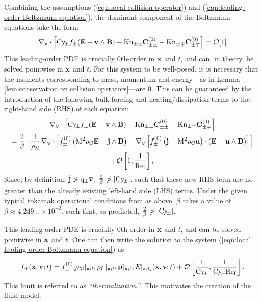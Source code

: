     Combining the assumptions (\ref{eqn:local collision operator}) and (\ref{eqn:leading-order Boltzmann equation}), the dominant component of the Boltzmann equations take the form
    \begin{equation}
        \nabla_{\mathbf{v}}\cdot\left[\mathrm{Cy}\!_{\pm}f_{\pm}(\mathbf{E} + \mathbf{v}\wedge\mathbf{B}) - \mathrm{Kn}_{\pm\pm}\mathbf{C}_{\pm\pm}^{(0)} - \mathrm{Kn}_{\pm\mp}\mathbf{C}_{\pm\mp}^{(0)}\right]  =  \mathcal{O}[1]
    \end{equation}
    This leading-order PDE is crucially 0th-order in $\mathbf{x}$ and $t$, and can, in theory, be solved pointwise in $\mathbf{x}$ and $t$. For this system to be well-posed, it is necessary that the moments corresponding to mass, momentum and energy---as in Lemma \ref{lem:conservation on collision operators}---are 0. This can be guaranteed by the introduction of the following bulk forcing and heating/dissipation terms to the right-hand side (RHS) of each equation:
    \begin{multline}\label{eqn:local leading-order Boltzmann equation}
        \nabla_{\mathbf{v}}\cdot\left[\mathrm{Cy}\!_{\pm}f_{\pm}(\mathbf{E} + \mathbf{v}\wedge\mathbf{B}) - \mathrm{Kn}_{\pm\pm}\mathbf{C}_{\pm\pm}^{(0)} - \mathrm{Kn}_{\pm\mp}\mathbf{C}_{\pm\mp}^{(0)}\right]  \\
        =  \frac{2}{\beta}\cdot\frac{1}{\rho_{\mathrm{M}}}\nabla_{\mathbf{v}}\cdot\left[f_{\pm}^{(0)}\left(\mathrm{M}^{2}\rho_{\mathrm{C}}\mathbf{E} + \mathbf{j}\wedge\mathbf{B}\right) - \nabla_{\mathbf{v}}\left[f_{\pm}^{(0)}\left(\mathbf{j} - \mathrm{M}^{2}\rho_{\mathrm{C}}\mathbf{u}\right)\cdot\left(\mathbf{E} + \mathbf{u}\wedge\mathbf{B}\right)\right]\right]  \\
        + \mathcal{O}\left[1, \frac{1}{\mathrm{Re}_{\mathrm{f}}}\right],
    \end{multline}
    Since, by definition, $\overline{\mathbf{j}}  \ngtr  \mathrm{q}_{\pm}\overline{\mathbf{v}}$, $\frac{2}{\beta}  \ngtr  |\mathrm{Cy}\!_{\pm}|$, such that these new RHS term are no greater than the already existing left-hand side (LHS) terms.  Under the given typical tokamak operational conditions from \cite{Wes00} as above, $\beta$ takes a value of $\beta  \approx 4.249\ldots\times 10^{- 3}$, such that, as predicted, $\frac{2}{\beta}  \ngtr  |\mathrm{Cy}\!_{\pm}|$.
    
    This leading-order PDE is crucially 0th-order in $\mathbf{x}$ and $t$, and can be solved pointwise in $\mathbf{x}$ and $t$. One can then write the solution to the system (\ref{eqn:local leading-order Boltzmann equation}) as
    \begin{equation}\label{eqn:thermalization}
        f_{\pm}(\mathbf{x}, \mathbf{v}; t)  =  f_{\pm}^{(0)}[\rho_{\mathrm{M}}|_{\mathbf{x}; t}, \rho_{\mathrm{C}}|_{\mathbf{x}; t}, \mathbf{p}|_{\mathbf{x}; t}, E|_{\mathbf{x}; t}](\mathbf{x}, \mathbf{v}; t) + \mathcal{O}\left[\frac{1}{\mathrm{Cy}\!_{+}}, \frac{1}{\mathrm{Cy}\!_{+}\mathrm{Re}_{\mathrm{f}}}\right].
    \end{equation}
    This limit is referred to as \emph{``thermalization''}. This motivates the creation of the fluid model.

    
